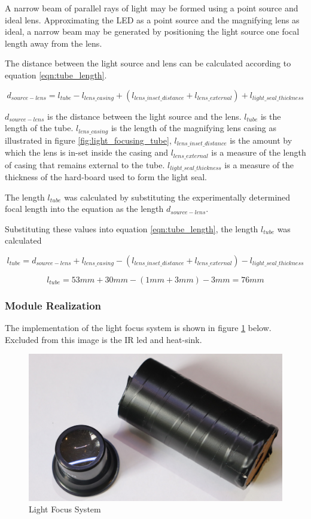 A narrow beam of parallel rays of light may be formed using a point source and ideal lens. Approximating the LED as a point source and the magnifying lens as ideal, a narrow beam may be generated by positioning the light source one focal length away from the lens.

The distance between the light source and lens can be calculated according to equation \ref{eqn:tube_length}.

\begin{equation}
	d_{source-lens} = l_{tube} - l_{lens\_casing} + (l_{lens\_inset\_distance} + l_{lens\_external}) + l_{light\_seal\_thickness}
	\label{eqn:tube_length}
\end{equation}

$d_{source-lens}$ is the distance between the light source and the lens. $l_{tube}$ is the length of the tube. $l_{lens\_casing}$ is the length of the magnifying lens casing as illustrated in figure \ref{fig:light_focusing_tube}, $l_{lens\_inset\_distance}$ is the amount by which the lens is in-set inside the casing and $l_{lens\_external}$ is a measure of the length of casing that remains external to the tube. $l_{light\_seal\_thickness}$ is a measure of the thickness of the hard-board used to form the light seal.

The length $l_{tube}$ was calculated by substituting the experimentally determined focal length into the equation as the length $d_{source-lens}$.

Substituting these values into equation \ref{eqn:tube_length}, the length $l_{tube}$ was calculated

\[l_{tube} = d_{source-lens} + l_{lens\_casing} - (l_{lens\_inset\_distance} + l_{lens\_external}) - l_{light\_seal\_thickness}\]

\[l_{tube} = 53mm + 30mm - (1mm + 3mm) - 3mm = 76mm\]


\subsubsection{Module Realization}
The implementation of the light focus system is shown in figure \ref{fig:module_light_focus} below. Excluded from this image is the IR led and heat-sink.

\begin{figure}[H]
	\centering
	\includegraphics[width=.6\textwidth]{figures/modules/light_focus_tube_lens.jpg}
	\caption{Light Focus System}
	\label{fig:module_light_focus}
\end{figure}




